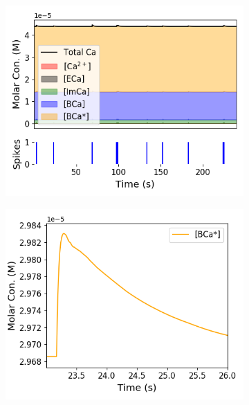 \documentclass[a4paper,12pt]{article}
\theoremstyle{definition}
\begin{document}
\begin{figure}[p]
  \begin{subfigure}{0.5\textwidth}
    \includegraphics[width=\textwidth]{figures/concentration_dynamics_18.png}
    \caption{}
    \label{fig:concentration_dynamics_a}
  \end{subfigure}
  \begin{subfigure}{0.5\textwidth}
    \includegraphics[width=\textwidth]{figures/concentration_dynamics_18_zoomed_BCa_star.png}
    \caption{}
  \end{subfigure}
  \begin{subfigure}{0.5\textwidth}

\end{subfigure}
\end{figure}
\end{document}
